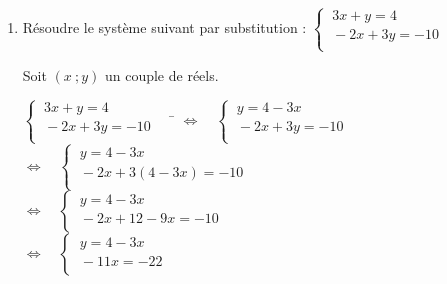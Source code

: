 \documentclass[a4paper,11pt,exos]{nsi}
\begin{document}
    \begin{enumerate}
        \item \textcolor{UGLiBlue}{Résoudre le système suivant par substitution : $\left\{
			\begin{array}{l}
				\ 3x+y=4 \\
				\ -2x+3y=-10 \\
			\end{array} \right.$}

            Soit $(x\ ;y)$ un couple de réels.
            \begin{tabbing}
                $\left\{
                    \begin{array}{l}
                    \ 3x+y=4 \\
                    \ -2x+3y=-10 \\
                \end{array} \right. \quad$
                \= $\iff \quad \left\{
                    \begin{array}{l}
                    \ y=4-3x \\
                    \ -2x+3y=-10 \\
                \end{array} \right.$\\[1em]
                
                \>  $\iff \quad \left\{
                    \begin{array}{l}
                    \ y=4-3x \\
                    \ -2x+3(4-3x)=-10 \\
                \end{array} \right.$\\[1em]
        
                \>  $\iff \quad \left\{
                    \begin{array}{l}
                    \ y=4-3x \\
                    \ -2x+12-9x=-10 \\
                \end{array} \right.$\\[1em]
        
                \>  $\iff \quad \left\{
                    \begin{array}{l}
                    \ y=4-3x \\
                    \ -11x=-22 \\
                \end{array} \right.$\\[1em]
        

\end{tabbing}
\end{enumerate}
\end{document}
